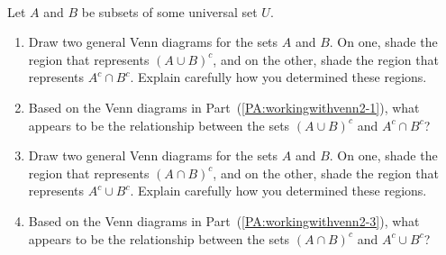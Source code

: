 \begin{previewactivity} \label{PA:workingwithvenn2} \hfill \\
Let $A$ and $B$ be subsets of some universal set $U$.

\begin{enumerate}
\item Draw two general Venn diagrams for the sets  $A$  and  $B$.  On one, shade the region that represents  $\left( {A \cup B} \right)^c $, and on the other, shade the region that represents  $A^c  \cap B^c $.  Explain carefully how you determined these regions. 
\label{PA:workingwithvenn2-1}%

\item Based on the Venn diagrams in Part~(\ref{PA:workingwithvenn2-1}), what appears to be the relationship between the sets   $\left( {A \cup B} \right)^c $ and   $A^c  \cap B^c $?

\item Draw two general Venn diagrams for the sets  $A$  and  $B$.  On one, shade the region that represents  $\left( {A \cap B} \right)^c $, and on the other, shade the region that represents  $A^c \cup B^c $.  Explain carefully how you determined these regions.  \label{PA:workingwithvenn2-3}

\item Based on the Venn diagrams in Part~(\ref{PA:workingwithvenn2-3}), what appears to be the relationship between the sets      $\left( {A \cap B} \right)^c $ and  $A^c \cup B^c $?

\end{enumerate}
\end{previewactivity}
\hbreak
%
